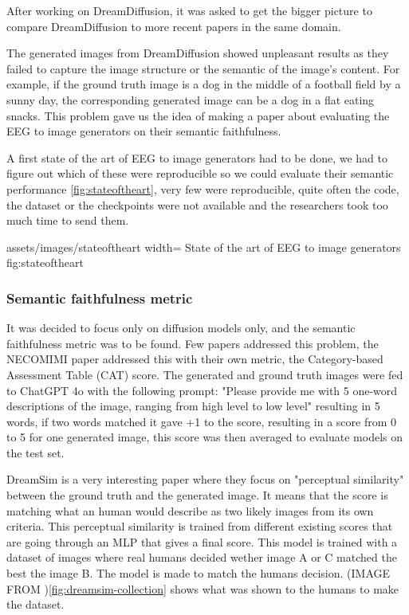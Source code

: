 After working on DreamDiffusion, it was asked to get the bigger picture to
compare DreamDiffusion to more recent papers in the same domain.

The generated images from DreamDiffusion showed unpleasant results as they
failed to capture the image structure or the semantic of the image's content.
For example, if the ground truth image is a dog in the middle of a football
field by a sunny day, the corresponding generated image can be a dog in a flat
eating snacks. This problem gave us the idea of making a paper about evaluating
the EEG to image generators on their semantic faithfulness.

A first state of the art of EEG to image generators had to be done, we had to
figure out which of these were reproducible so we could evaluate their semantic
performance \cref{fig:stateoftheart}, very few were reproducible, quite often
the code, the dataset or the checkpoints were not available and the researchers
took too much time to send them.

\insertfigure
    {assets/images/stateoftheart}
    {width=\textwidth}
    {State of the art of EEG to image generators}
    {fig:stateoftheart}

\subsubsection{Semantic faithfulness metric}

It was decided to focus only on diffusion models only, and the semantic
faithfulness metric was to be found. Few papers addressed this problem, the
NECOMIMI \cite{necomimi} paper addressed this with their own metric,
the Category-based Assessment Table (CAT) score. The generated and ground truth
images were fed to ChatGPT 4o with the following prompt: "Please provide me with
5 one-word descriptions of the image, ranging from high level to low level"
resulting in 5 words, if two words matched it gave +1 to the score, resulting in
a score from 0 to 5 for one generated image, this score was then averaged to
evaluate models on the test set.

DreamSim \cite{dreamsim} is a very interesting paper where they focus on
"perceptual similarity" between the ground truth and the generated image. It
means that the score is matching what an human would describe as two likely
images from its own criteria. This perceptual similarity is trained from
different existing scores that are going through an MLP that gives a final
score. This model is trained with a dataset of images where real humans decided
wether image A or C matched the best the image B. The model is made to match the
humans decision. (IMAGE FROM \cite{dreamsim})\cref{fig:dreamsim-collection}
shows what was shown to the humans to make the dataset.

